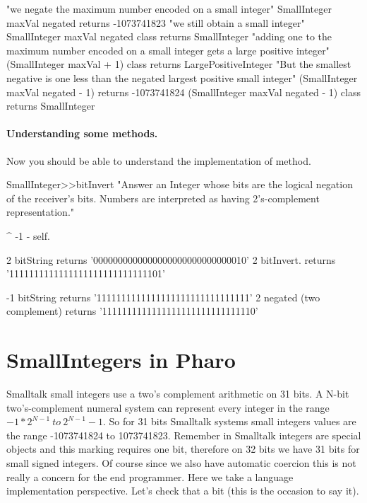 \documentclass[a4paper,10pt,twoside]{book}
\begin{document}
\begin{code}{} 
"we negate the maximum number encoded on a small integer"
SmallInteger maxVal negated	 
	  	returns -1073741823
"we still obtain a small integer"		
SmallInteger maxVal negated class
		returns SmallInteger
"adding one to the maximum number encoded on a small integer gets a large positive integer"
(SmallInteger maxVal + 1) class
		returns LargePositiveInteger		
"But the smallest negative is one less than the negated largest positive small integer"		
(SmallInteger maxVal negated - 1) 
		returns -1073741824 
(SmallInteger maxVal negated - 1) class 
		returns SmallInteger 		 
\end{code}


\paragraph{Understanding some methods.}
Now you should be able to understand the implementation of  method.

\begin{code}{}
SmallInteger>>bitInvert
    "Answer an Integer whose bits are the logical negation of the receiver's bits.
    Numbers are interpreted as having 2's-complement representation."

	^ -1 - self.
\end{code}

\begin{code}{}
2 bitString
	returns '0000000000000000000000000000010'
2 bitInvert.
	returns '1111111111111111111111111111101'
	
-1 bitString
	returns '1111111111111111111111111111111'
2 negated (two complement)
	returns '1111111111111111111111111111110'
\end{code}


\section{SmallIntegers in Pharo}

Smalltalk small integers use a two's complement arithmetic on 31 bits.  A N-bit two's-complement numeral system can represent every integer in the range $-1 * 2^{N-1}\ to\ 2^{N-1}-1$. So for 31 bits Smalltalk systems small integers values are the range -1073741824 to  1073741823.  Remember in Smalltalk integers are special objects and this marking requires one bit, therefore on 32 bits we have 31 bits for small signed integers. Of course since we also have automatic coercion this is not really a concern for the end programmer. Here we take a language implementation perspective.
 Let's check that a bit (this is the occasion to say it). 
\end{document}
